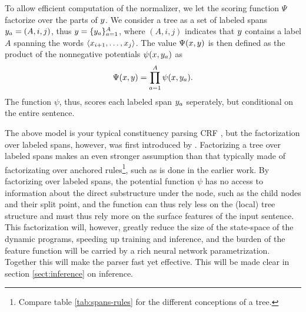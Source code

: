  To allow efficient computation of the normalizer, we let the scoring function $\Psi$ factorize over the parts of $y$. We consider a tree as a set of labeled spans $y_a = (A, i, j)$, thus $y = \{ y_a \}_{a=1}^A$, where $(A, i, j)$ indicates that $y$ contains a label $A$ spanning the words $\langle x_{i+1}, \dots, x_j \rangle$. The value $\Psi(x, y)$ is then defined as the product of the nonnegative potentials $\psi(x, y_a)$ as
  \begin{align}
    \Psi(x, y) = \prod_{a=1}^A \psi(x, y_a).
  \end{align}
  The function $\psi$, thus, scores each labeled span $y_a$ seperately, but conditional on the entire sentence.

  The above model is your typical constituency parsing CRF \citep{finkel2008crf,klein2015crf}, but the factorization over labeled spans, however, was first introduced by \citet{stern2017minimal}. Factorizing a tree over labeled spans makes an even stronger assumption than that typically made of factorizating over anchored rules\footnote{Compare table \ref{tab:spans-rules} for the different conceptions of a tree.}, such as is done in the earlier work. By factorizing over labeled spans, the potential function $\psi$ has no access to information about the direct substructure under the node, such as the child nodes and their split point, and the function can thus rely less on the (local) tree structure and must thus rely more on the surface features of the input sentence. This factorization will, however, greatly reduce the size of the state-space of the dynamic programs, speeding up training and inference, and the burden of the feature function will be carried by a rich neural network parametrization. Together this will make the parser fast yet effective. This will be made clear in section \ref{sect:inference} on inference.

